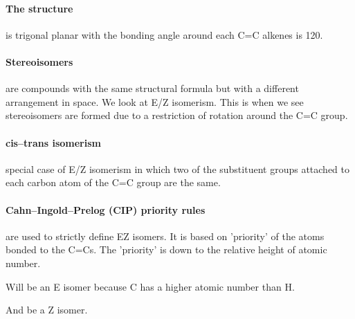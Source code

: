 \documentclass[11pt,a4paper]{memoir}
\begin{document}
	\paragraph{The structure} is trigonal planar with the bonding angle around each C=C alkenes is 120\degree .
	
	\paragraph{Stereoisomers} are compounds with the same structural formula but with a different arrangement in space. We look at E/Z isomerism. This is when we see stereoisomers are formed due to a restriction of rotation around the C=C group.
	
	\paragraph{cis–trans isomerism} special case of E/Z isomerism in which two of the substituent groups attached to each carbon atom of the C=C group are the same.
	
	\paragraph{Cahn–Ingold–Prelog (CIP) priority rules} are used to strictly define EZ isomers. It is based on 'priority' of the atoms bonded to the C=Cs. The 'priority' is down to the relative height of atomic number.
	\begin{center}
	\end{center}
	Will be an E isomer because C has a higher atomic number than H.
	\begin{center}
	\end{center}
	And be a Z isomer.
	
	
\end{document}
